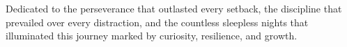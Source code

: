 Dedicated to the perseverance that outlasted every setback, the discipline that prevailed over every distraction, and the countless sleepless nights that illuminated this journey marked by curiosity, resilience, and growth.

